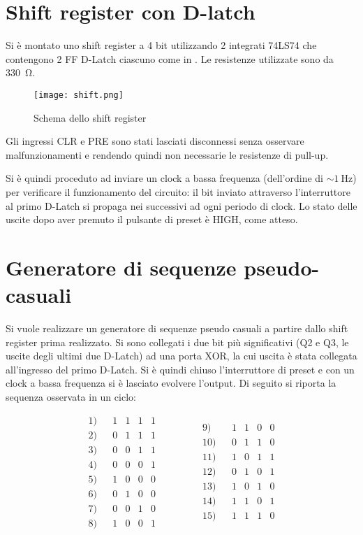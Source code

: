 \section{Shift register con D-latch}
Si è montato uno shift register a 4 bit utilizzando 2 integrati 74LS74 che contengono 2 FF D-Latch ciascuno come in . Le resistenze utilizzate sono da \SI{330}{\ohm}.

	\begin{figure}[H]
		\centering
		\texttt{[image: shift.png]}
		\caption{Schema dello shift register}
		\label{f:shift}
	\end{figure}

Gli ingressi CLR e PRE sono stati lasciati disconnessi senza osservare malfunzionamenti e rendendo quindi non necessarie le resistenze di pull-up.

Si è quindi proceduto ad inviare un clock a bassa frequenza (dell'ordine di $\sim\SI{1}{\hertz}$) per verificare il funzionamento del circuito: il bit inviato attraverso l'interruttore al primo D-Latch si propaga nei successivi ad ogni periodo di clock.
Lo stato delle uscite dopo aver premuto il pulsante di preset è HIGH, come atteso.
 
\section{Generatore di sequenze pseudo-casuali}
Si vuole realizzare un generatore di sequenze pseudo casuali a partire dallo shift register prima realizzato. Si sono collegati i due bit più significativi (Q2 e Q3, le uscite degli ultimi due D-Latch) ad una porta XOR, la cui uscita è stata collegata all'ingresso del primo D-Latch.
Si è quindi chiuso l'interruttore di preset e con un clock a bassa frequenza si è lasciato evolvere l'output.
Di seguito si riporta la sequenza osservata in un ciclo:

\begin{equation*}
\begin{matrix}
1)	&		&	1	&	1	&	1	&	1	\\
2)	&		&	0	&	1	&	1	&	1	\\
3)	&		&	0	&	0	&	1	&	1	\\
4)	&		&	0	&	0	&	0	&	1	\\
5)	&		&	1	&	0	&	0	&	0	\\
6)	&		&	0	&	1	&	0	&	0	\\
7)	&		&	0	&	0	&	1	&	0	\\
8)	&		&	1	&	0	&	0	&	1	\\
\end{matrix}
\qquad \qquad
\begin{matrix}
9)	&		&	1	&	1	&	0	&	0	\\
10)	&		&	0	&	1	&	1	&	0	\\
11)	&		&	1	&	0	&	1	&	1	\\
12)	&		&	0	&	1	&	0	&	1	\\
13)	&		&	1	&	0	&	1	&	0	\\
14)	&		&	1	&	1	&	0	&	1	\\
15)	&		&	1	&	1	&	1	&	0	\\
\end{matrix}
\end{equation*}